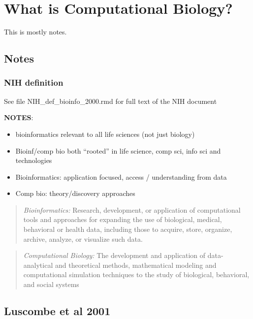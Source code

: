 \documentclass[
]{book}
\providecommand{\tightlist}{%
  \setlength{\itemsep}{0pt}\setlength{\parskip}{0pt}}
\begin{document}
\hypertarget{what-is-computational-biology}{%
\chapter{What is Computational Biology?}\label{what-is-computational-biology}}

This is mostly notes.

\hypertarget{notes}{%
\section{Notes}\label{notes}}

\hypertarget{nih-definition}{%
\subsection{NIH definition}\label{nih-definition}}

See file NIH\_def\_bioinfo\_2000.rmd for full text of the NIH document

\textbf{NOTES}:

\begin{itemize}
\tightlist
\item
  bioinformatics relevant to all life sciences (not just biology)
\item
  Bioinf/comp bio both ``rooted'' in life science, comp sci, info sci and technologies
\item
  Bioinformatics: application focused, access / understanding from data
\item
  Comp bio: theory/discovery approaches
\end{itemize}

\begin{quote}
\emph{Bioinformatics:} Research, development, or application of computational tools and approaches for expanding the use of biological, medical, behavioral or health data, including those to acquire, store, organize, archive, analyze, or visualize such data.
\end{quote}

\begin{quote}
\emph{Computational Biology:} The development and application of data-analytical and
theoretical methods, mathematical modeling and computational simulation techniques
to the study of biological, behavioral, and social systems
\end{quote}

\hypertarget{luscombe-et-al-2001}{%
\section{Luscombe et al 2001}\label{luscombe-et-al-2001}}
\end{document}
